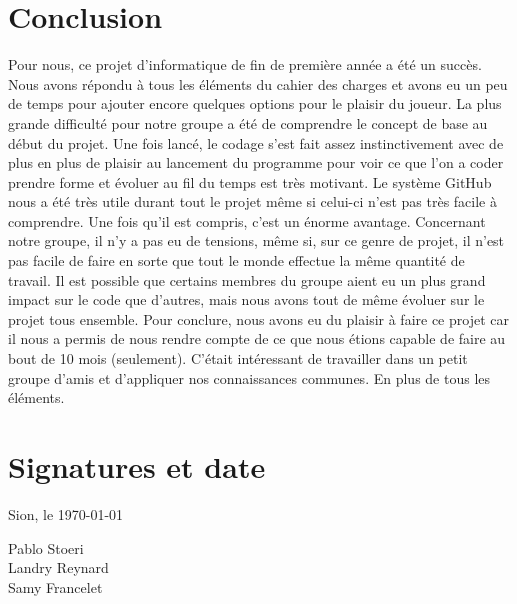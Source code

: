 \section{Conclusion}
Pour nous, ce projet d’informatique de fin de première année a été un succès. Nous avons répondu à tous les éléments du cahier des charges et avons eu un peu de temps pour ajouter encore quelques options pour le plaisir du joueur. La plus grande difficulté pour notre groupe a été de comprendre le concept de base au début du projet. Une fois lancé, le codage s’est fait assez instinctivement avec de plus en plus de plaisir au lancement du programme pour voir ce que l’on a coder prendre forme et évoluer au fil du temps est très motivant.
Le système GitHub nous a été très utile durant tout le projet même si celui-ci n’est pas très facile à comprendre. Une fois qu’il est compris, c’est un énorme avantage.
Concernant notre groupe, il n’y a pas eu de tensions, même si, sur ce genre de projet, il n’est pas facile de faire en sorte que tout le monde effectue la même quantité de travail. Il est possible que certains membres du groupe aient eu un plus grand impact sur le code que d’autres, mais nous avons tout de même évoluer sur le projet tous ensemble.
Pour conclure, nous avons eu du plaisir à faire ce projet car il nous a permis de nous rendre compte de ce que nous étions capable de faire au bout de 10 mois (seulement). C’était intéressant de travailler dans un petit groupe d’amis et d’appliquer nos connaissances communes. En plus de tous les éléments.

\section{Signatures et date}

Sion, le \today \\
 {\raggedright
  Pablo Stoeri \\

	Landry Reynard \\

	Samy Francelet \\
}
